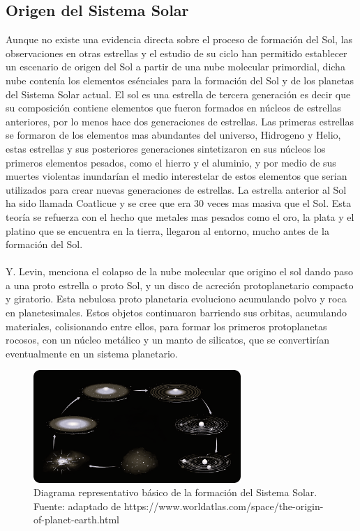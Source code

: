 \documentclass[12pt]{article}
\begin{document}
\subsection{Origen del Sistema Solar}\label{sec:origen_solar}
Aunque no existe una evidencia directa sobre el proceso de formación del Sol, las observaciones en 
otras estrellas y el estudio de su ciclo han permitido establecer un escenario de origen del Sol a 
partir de una nube molecular primordial\parencite{TheFormationandEvolutionoftheSolarSystem}, dicha nube 
contenía los elementos esénciales para la formación del Sol y de los planetas del Sistema Solar actual. 
El sol es una estrella de tercera generación es decir que su composición contiene elementos que fueron 
formados en núcleos de estrellas anteriores, por lo menos hace dos generaciones de estrellas. Las 
primeras estrellas se formaron de los elementos mas abundantes del universo, Hidrogeno y Helio, estas 
estrellas y sus posteriores generaciones sintetizaron en sus núcleos los primeros elementos pesados, como 
el hierro y el aluminio, y por medio de sus muertes violentas inundarían el medio interestelar de estos 
elementos que serian utilizados para crear nuevas generaciones de estrellas. La estrella anterior al Sol 
ha sido llamada Coatlicue y se cree que era 30 veces mas masiva que el Sol. Esta teoría se refuerza con 
el hecho que metales mas pesados como el oro, la plata y el platino que se encuentra en la tierra, llegaron 
al entorno, mucho antes de la formación del Sol\parencite{Sun}.\\
\\
Y. Levin\parencite{levin2003origin}, menciona el colapso de la nube molecular que origino el sol dando 
paso a una proto estrella o proto Sol, y un disco de acreción protoplanetario compacto y giratorio. 
Esta nebulosa proto planetaria evoluciono acumulando polvo y roca en planetesimales. Estos objetos 
continuaron barriendo sus orbitas, acumulando materiales, colisionando entre ellos, para formar los 
primeros protoplanetas rocosos, con un núcleo metálico y un manto de silicatos, que se convertirían 
eventualmente en un sistema planetario.
\begin{figure}[H]
    \includegraphics[width=0.7\textwidth]{images/System_solar_origin.png}
    \centering
    \caption{Diagrama representativo básico de la formación del Sistema Solar.
    Fuente: adaptado de https://www.worldatlas.com/space/the-origin-of-planet-earth.html}
    \label{fig:formation_solar_System}
\end{figure}
\end{document}
